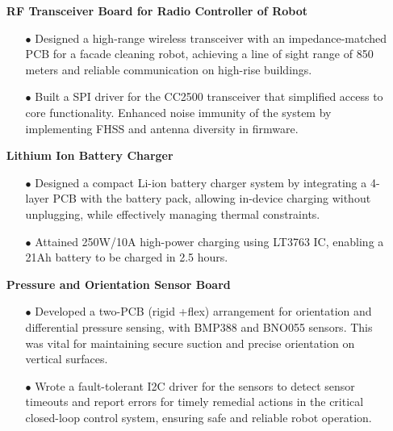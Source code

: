 \documentclass[11pt]{article}
\begin{document}
      \begin{itemize}[leftmargin=0.01in]
        \item[]  \textbf{RF Transceiver Board for Radio Controller of Robot}
            \begin{itemize}\setlength{\itemsep}{0pt}\setlength{\parskip}{0pt}\vspace{-0.3em}
                \item[$\bullet$] Designed a high-range wireless transceiver with an impedance-matched PCB for a facade cleaning robot, achieving a line of sight range of 850 meters and reliable communication on high-rise buildings.
                \item[$\bullet$] Built a  SPI driver for the CC2500 transceiver that simplified access to core functionality. Enhanced noise immunity of the system by implementing FHSS and antenna diversity in firmware.
            \end{itemize}
        \item[]  \textbf{Lithium Ion Battery Charger}
            \begin{itemize}\setlength{\itemsep}{0pt}\setlength{\parskip}{0pt}\vspace{-0.3em}
                \item[$\bullet$] Designed a compact Li-ion battery charger system by integrating a 4-layer PCB with the battery pack, allowing in-device charging without unplugging, while effectively managing thermal constraints. 
                \item[$\bullet$] Attained 250W/10A high-power charging using LT3763 IC, enabling a 21Ah battery to be charged in 2.5 hours.
            \end{itemize}
        \item[]  \textbf{Pressure and Orientation Sensor Board}
            \begin{itemize}\setlength{\itemsep}{0pt}\setlength{\parskip}{0pt}\vspace{-0.3em}
                \item[$\bullet$] Developed a two-PCB (rigid +flex) arrangement for orientation and differential pressure sensing, with BMP388 and BNO055 sensors. This was vital for maintaining secure suction and precise orientation on vertical surfaces.
                \item[$\bullet$] Wrote a fault-tolerant I2C driver for the sensors to detect sensor timeouts and report errors for timely remedial actions in the critical closed-loop control system, ensuring safe and reliable robot operation.

\end{itemize}
\end{itemize}
\end{document}
